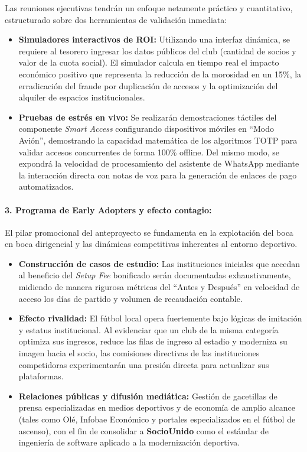 Las reuniones ejecutivas tendrán un enfoque netamente práctico y cuantitativo, estructurado sobre dos herramientas de validación inmediata:
\begin{itemize}
    \item \textbf{Simuladores interactivos de ROI:} Utilizando una interfaz dinámica, se requiere al tesorero ingresar los datos públicos del club (cantidad de socios y valor de la cuota social). El simulador calcula en tiempo real el impacto económico positivo que representa la reducción de la morosidad en un 15\%, la erradicación del fraude por duplicación de accesos y la optimización del alquiler de espacios institucionales.
    \item \textbf{Pruebas de estrés en vivo:} Se realizarán demostraciones táctiles del componente \textit{Smart Access} configurando dispositivos móviles en ``Modo Avión'', demostrando la capacidad matemática de los algoritmos TOTP para validar accesos concurrentes de forma 100\% offline. Del mismo modo, se expondrá la velocidad de procesamiento del asistente de WhatsApp mediante la interacción directa con notas de voz para la generación de enlaces de pago automatizados.
\end{itemize}

\paragraph{3. Programa de Early Adopters y efecto contagio:}

El pilar promocional del anteproyecto se fundamenta en la explotación del boca en boca dirigencial y las dinámicas competitivas inherentes al entorno deportivo.
\begin{itemize}
    \item \textbf{Construcción de casos de estudio:} Las instituciones iniciales que accedan al beneficio del \textit{Setup Fee} bonificado serán documentadas exhaustivamente, midiendo de manera rigurosa métricas del ``Antes y Después'' en velocidad de acceso los días de partido y volumen de recaudación contable.
    \item \textbf{Efecto rivalidad:} El fútbol local opera fuertemente bajo lógicas de imitación y estatus institucional. Al evidenciar que un club de la misma categoría optimiza sus ingresos, reduce las filas de ingreso al estadio y moderniza su imagen hacia el socio, las comisiones directivas de las instituciones competidoras experimentarán una presión directa para actualizar sus plataformas.
    \item \textbf{Relaciones públicas y difusión mediática:} Gestión de gacetillas de prensa especializadas en medios deportivos y de economía de amplio alcance (tales como Olé, Infobae Económico y portales especializados en el fútbol de ascenso), con el fin de consolidar a \textbf{SocioUnido} como el estándar de ingeniería de software aplicado a la modernización deportiva.
\end{itemize}

